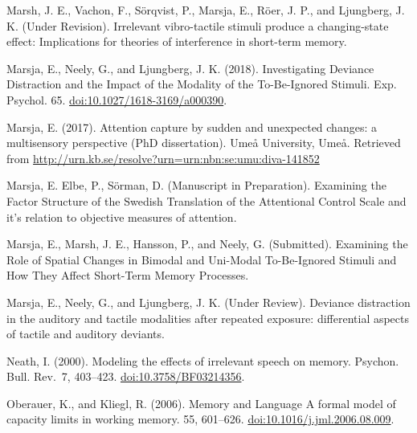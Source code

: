 \documentclass[]{article}
\begin{document}
Marsh, J. E., Vachon, F., Sörqvist, P., Marsja, E., Röer, J. P., and
Ljungberg, J. K. (Under Revision). Irrelevant vibro-tactile stimuli
produce a changing-state effect: Implications for theories of
interference in short-term memory.

Marsja, E., Neely, G., and Ljungberg, J. K. (2018). Investigating
Deviance Distraction and the Impact of the Modality of the To-Be-Ignored
Stimuli. Exp. Psychol. 65. \url{doi:10.1027/1618-3169/a000390}.

Marsja, E. (2017). Attention capture by sudden and unexpected changes: a
multisensory perspective (PhD dissertation). Umeå University, Umeå.
Retrieved from
\url{http://urn.kb.se/resolve?urn=urn:nbn:se:umu:diva-141852}

Marsja, E. Elbe, P., Sörman, D. (Manuscript in Preparation). Examining
the Factor Structure of the Swedish Translation of the Attentional
Control Scale and it's relation to objective measures of attention.

Marsja, E., Marsh, J. E., Hansson, P., and Neely, G. (Submitted).
Examining the Role of Spatial Changes in Bimodal and Uni-Modal
To-Be-Ignored Stimuli and How They Affect Short-Term Memory Processes.

Marsja, E., Neely, G., and Ljungberg, J. K. (Under Review). Deviance
distraction in the auditory and tactile modalities after repeated
exposure: differential aspects of tactile and auditory deviants.

Neath, I. (2000). Modeling the effects of irrelevant speech on memory.
Psychon. Bull. Rev.~7, 403--423. \url{doi:10.3758/BF03214356}.

Oberauer, K., and Kliegl, R. (2006). Memory and Language A formal model
of capacity limits in working memory. 55, 601--626.
\url{doi:10.1016/j.jml.2006.08.009}.
\end{document}
